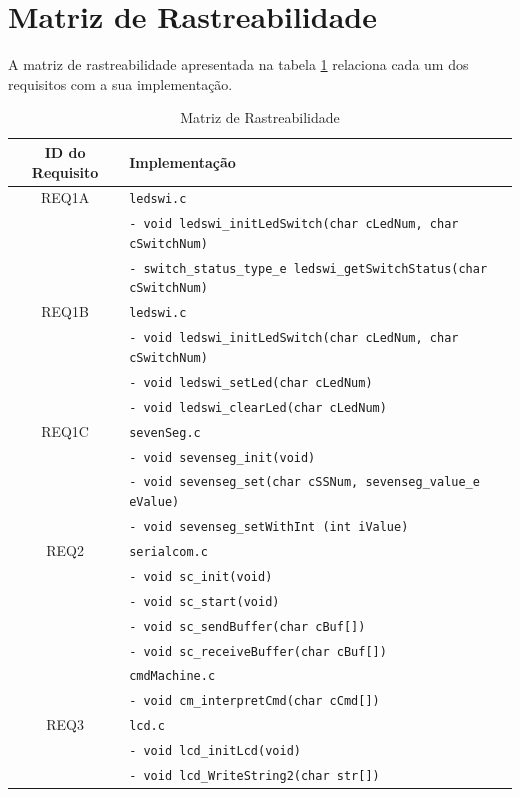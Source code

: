\documentclass{article}
\begin{document}
\section{Matriz de Rastreabilidade}
A matriz de rastreabilidade apresentada na tabela \ref*{tab:rastreabilidade} relaciona cada um dos requisitos com a sua implementação.
\begin{table}[H]
	\centering
	\caption{Matriz de Rastreabilidade}
	\label{tab:rastreabilidade}
	\small
	\begin{tabular}{|c|l|}
		\hline \bfseries{ID do Requisito} & \bfseries{Implementação}\\ 
		\hline REQ1A 	& \texttt{ledswi.c}\\ 
						& \texttt{- void ledswi\_initLedSwitch(char cLedNum, char cSwitchNum)}\\
						& \texttt{- switch\_status\_type\_e ledswi\_getSwitchStatus(char cSwitchNum)}\\
		\hline REQ1B 	& \texttt{ledswi.c}\\ 
						& \texttt{- void ledswi\_initLedSwitch(char cLedNum, char cSwitchNum)}\\
						& \texttt{- void ledswi\_setLed(char cLedNum)}\\ 
						& \texttt{- void ledswi\_clearLed(char cLedNum)}\\
		\hline REQ1C 	& \texttt{sevenSeg.c}\\ 
						& \texttt{- void sevenseg\_init(void)}\\
						& \texttt{- void sevenseg\_set(char cSSNum, sevenseg\_value\_e eValue)}\\
						& \texttt{- void sevenseg\_setWithInt (int iValue)}\\
		\hline REQ2	 	& \texttt{serialcom.c}\\ 
						& \texttt{- void sc\_init(void)}\\
						& \texttt{- void sc\_start(void)}\\
						& \texttt{- void sc\_sendBuffer(char cBuf[])}\\
						& \texttt{- void sc\_receiveBuffer(char cBuf[])}\\
					& \texttt{cmdMachine.c}\\ 
						& \texttt{- void cm\_interpretCmd(char cCmd[])}\\
		\hline REQ3	 	& \texttt{lcd.c}\\ 
						& \texttt{- void lcd\_initLcd(void)}\\
						& \texttt{- void lcd\_WriteString2(char str[])}\\

\end{tabular}
\end{table}
\end{document}

